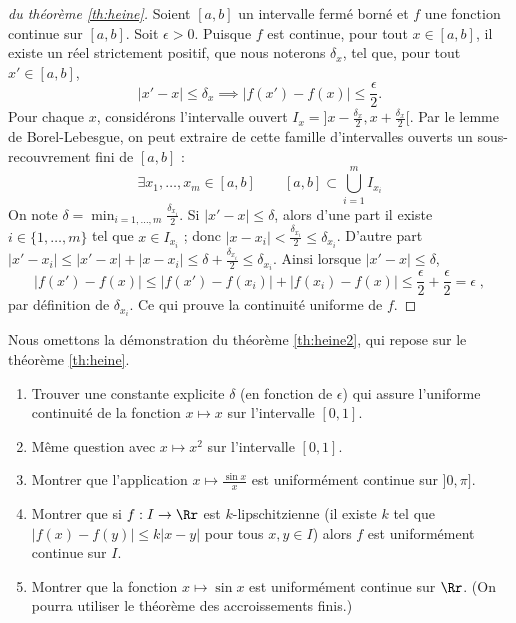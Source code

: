 \documentclass[class=report,crop=false]{standalone}
\begin{document}
\begin{proof}[du théorème \ref{th:heine}]
Soient $[a,b]$ un intervalle fermé borné et $f$ une fonction
continue sur $[a,b]$. Soit $\epsilon>0$. Puisque $f$ est continue, 
pour tout $x\in[a,b]$, il existe un
réel strictement positif, que nous noterons $\delta_x$, tel que, pour
tout $x'\in [a,b]$,
$$|x'-x|\le \delta_x \implies \big|f(x')-f(x)\big|\le \frac{\epsilon}{2}.$$
Pour chaque $x$, considérons
l'intervalle ouvert $I_x = \big]x-\frac{\delta_x}{2},x+\frac{\delta_x}{2}\big[$. 
Par le lemme de Borel-Lebesgue, on peut extraire de cette famille
d'intervalles ouverts un sous-recouvrement fini de $[a,b]$ :
$$\exists x_1,\ldots,x_m\in[a,b]\qquad [a,b]\subset \bigcup_{i=1}^m I_{x_i}
$$
On note $\delta = \min_{i=1,\ldots,m} \frac{\delta_{x_i}}{2}$.
Si $|x'-x|\le \delta$, alors 
d'une part il existe $i \in \{1,\ldots,m\}$ tel que 
$x \in I_{x_i}$ ; donc $|x-x_i| < \frac{\delta_{x_i}}{2} \le \delta_{x_i}$.
D'autre part $|x'-x_i| \le |x'-x|+|x-x_i| \le \delta + \frac{\delta_{x_i}}{2}
\le \delta_{x_i}$.
Ainsi lorsque $|x'-x| \le \delta$,
$$\big|f(x')-f(x)\big|\le \big|f(x')-f(x_i)\big|+\big|f(x_i)-f(x)\big|\le \frac{\epsilon}{2}
+\frac{\epsilon}{2}=\epsilon\;,$$
par définition de $\delta_{x_i}$.
Ce qui prouve la continuité uniforme de $f$.
\end{proof}

Nous omettons la démonstration du théorème \ref{th:heine2}, 
qui repose sur le théorème \ref{th:heine}.


\begin{miniexercices}
\begin{enumerate}
  \item Trouver une constante explicite $\delta$ (en fonction de $\epsilon$) 
  qui assure l'uniforme continuité
  de la fonction $x \mapsto x$ sur l'intervalle $[0,1]$.
  
  \item Même question avec $x \mapsto x^2$ sur l'intervalle $[0,1]$.
  
  \item Montrer que l'application $x \mapsto \frac{\sin x}{x}$ est uniformément continue sur $]0,\pi]$.
  
  \item Montrer que si $f : I \to \Rr$ est $k$-lipschitzienne (il existe $k$ tel que 
  $\big| f(x)-f(y) \big| \le k |x-y|$ pour tous $x,y \in I$) alors $f$
  est uniformément continue sur $I$.
  
  \item Montrer que la fonction $x \mapsto \sin x$ est uniformément continue sur $\Rr$.
  (On pourra utiliser le théorème des accroissements finis.)
\end{enumerate}
\end{miniexercices}
\end{document}
